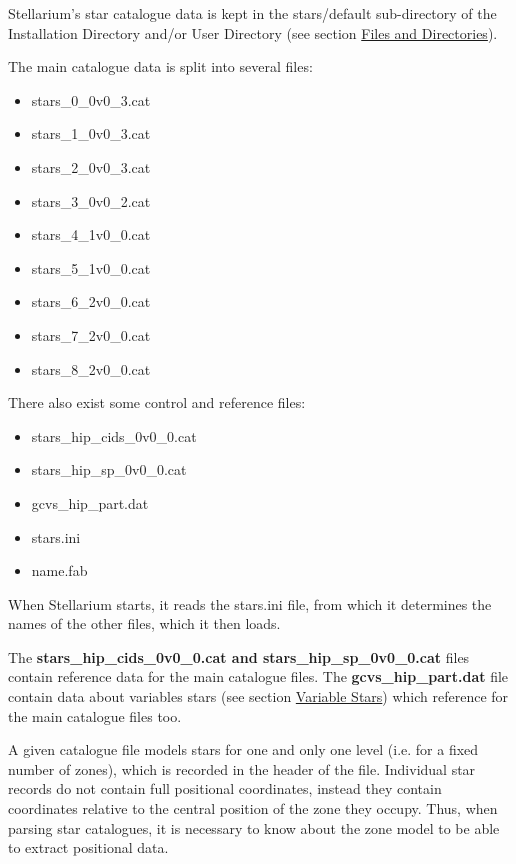 Stellarium's star catalogue data is kept in the stars/default
sub-directory of the Installation Directory and/or User Directory (see
section \href{Advanced_Use\#Files_and_Directories}{Files and
Directories}).

The main catalogue data is split into several files:

\begin{itemize}
\item
  stars\_0\_0v0\_3.cat
\item
  stars\_1\_0v0\_3.cat
\item
  stars\_2\_0v0\_3.cat
\item
  stars\_3\_0v0\_2.cat
\item
  stars\_4\_1v0\_0.cat
\item
  stars\_5\_1v0\_0.cat
\item
  stars\_6\_2v0\_0.cat
\item
  stars\_7\_2v0\_0.cat
\item
  stars\_8\_2v0\_0.cat
\end{itemize}

There also exist some control and reference files:

\begin{itemize}
\item
  stars\_hip\_cids\_0v0\_0.cat
\item
  stars\_hip\_sp\_0v0\_0.cat
\item
  gcvs\_hip\_part.dat
\item
  stars.ini
\item
  name.fab
\end{itemize}

When Stellarium starts, it reads the stars.ini file, from which it
determines the names of the other files, which it then loads.

The \textbf{stars\_hip\_cids\_0v0\_0.cat and stars\_hip\_sp\_0v0\_0.cat}
files contain reference data for the main catalogue files. The
\textbf{gcvs\_hip\_part.dat} file contain data about variables stars
(see section \href{Variable_Stars}{Variable Stars}) which reference for
the main catalogue files too.

A given catalogue file models stars for one and only one level (i.e. for
a fixed number of zones), which is recorded in the header of the file.
Individual star records do not contain full positional coordinates,
instead they contain coordinates relative to the central position of the
zone they occupy. Thus, when parsing star catalogues, it is necessary to
know about the zone model to be able to extract positional data.

